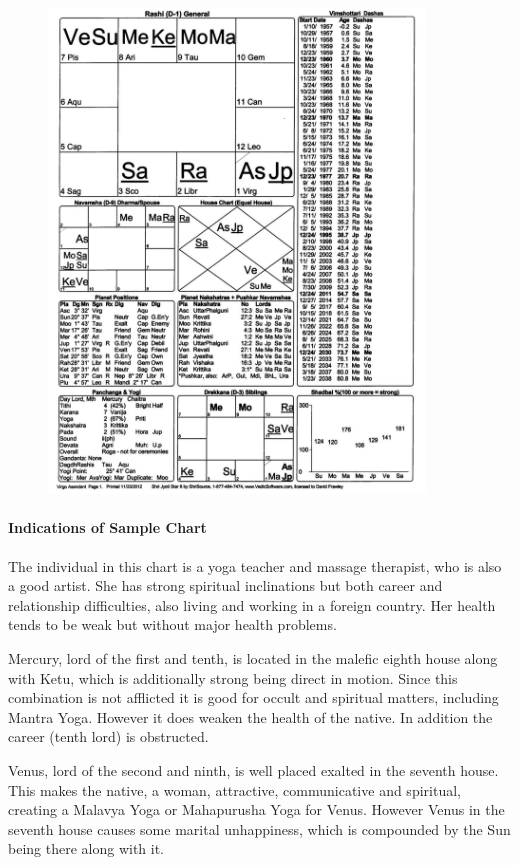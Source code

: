  

\begin{figure}[h]
\centering
\includegraphics[width=10cm]{pics/Virgo-Ascendant.jpg}
\caption{}
\end{figure}
 

 

\paragraph{Indications of Sample Chart}

 

The individual in this chart is a yoga teacher and massage therapist, who is also a good artist. She has strong spiritual inclinations but both career and relationship difficulties, also living and working in a foreign country. Her health tends to be weak but without major health problems.

 

Mercury, lord of the first and tenth, is located in the malefic eighth house along with Ketu, which is additionally strong being direct in motion. Since this combination is not afflicted it is good for occult and spiritual matters, including Mantra Yoga. However it does weaken the health of the native. In addition the career (tenth lord) is obstructed.

 

Venus, lord of the second and ninth, is well placed exalted in the seventh house. This makes the native, a woman, attractive, communicative and spiritual, creating a Malavya Yoga or Mahapurusha Yoga for Venus. However Venus in the seventh house causes some marital unhappiness, which is compounded by the Sun being there along with it.

